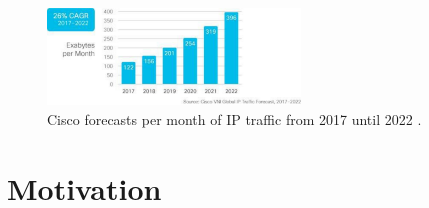 \begin{figure}[H]
  \begin{center}
    \includegraphics[width=0.6\textwidth]{fig/logos/ciscoForecast.pdf}
    \caption{Cisco forecasts per month of IP traffic from 2017 until 2022 \cite{ciscoForecast}.}
     \label{cisco11}
  \end{center}
\end{figure}


\newpage
\section{Motivation}
\label{motivation}

